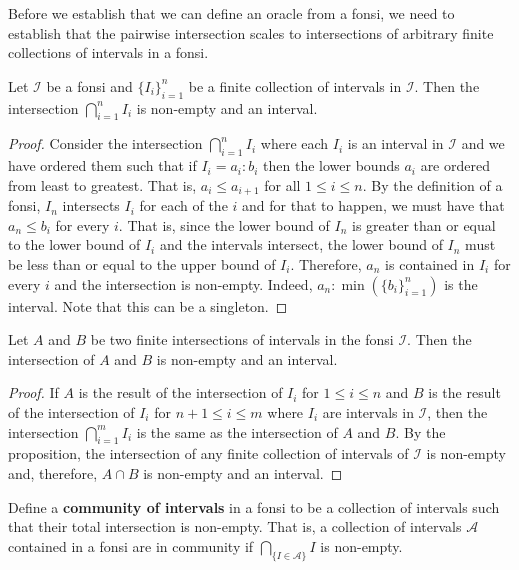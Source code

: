 \documentclass[12pt]{article}
\begin{document}
Before we establish that we can define an oracle from a fonsi, we need to establish that the pairwise intersection scales to intersections of arbitrary finite collections of intervals in a fonsi. 

\begin{proposition}
 Let $\mathcal{I}$ be a fonsi and $\{I_i\}_{i=1}^n$ be a finite collection of intervals in $\mathcal{I}$. Then the intersection $\bigcap_{i=1}^n I_i$ is non-empty and an interval.
\end{proposition}

\begin{proof} 
    Consider the intersection $\bigcap_{i=1}^n I_i$ where each $I_i$ is an interval in $\mathcal{I}$ and we have ordered them such that if $I_i = a_i : b_i$ then the lower bounds $a_i$ are ordered from least to greatest. That is,  $a_i \leq a_{i+1}$ for all $1 \leq i \leq n$. By the definition of a fonsi, $I_n$ intersects $I_i$ for each of the $i$ and for that to happen, we must have that $a_n \leq b_i$ for every $i$. That is, since the lower bound of $I_n$ is greater than or equal to the lower bound of $I_i$ and the intervals intersect, the lower bound of $I_n$ must be less than or equal to the upper bound of $I_i$. Therefore, $a_n$ is contained in $I_i$ for every $i$ and the intersection is non-empty. Indeed, $a_n : \min(\{b_i\}_{i=1}^n)$ is the interval. Note that this can be a singleton. 
\end{proof}


\begin{corollary}
Let $A$ and $B$ be two finite intersections of intervals in the fonsi $\mathcal{I}$. Then the intersection of $A$ and $B$ is non-empty and an interval. 
\end{corollary}

\begin{proof}
    If $A$ is the result of the intersection of $I_i$ for $1 \leq i \leq n$ and $B$ is the result of the intersection of $I_i$ for $n+1 \leq i \leq m$ where $I_i$ are intervals in $\mathcal{I}$, then the intersection $\bigcap_{i=1}^m I_i$ is the same as the intersection of $A$ and $B$. By the proposition, the intersection of any finite collection of intervals of $\mathcal{I}$ is non-empty and, therefore, $A \cap B$ is non-empty and an interval. 
\end{proof}

Define a \textbf{community of intervals} in a fonsi to be  a collection of intervals such that their total intersection is non-empty. That is, a collection of intervals $\mathcal{A}$ contained in a fonsi are in community if $\bigcap_{\{I \in \mathcal{A}\}} I$ is non-empty. 
\end{document}
